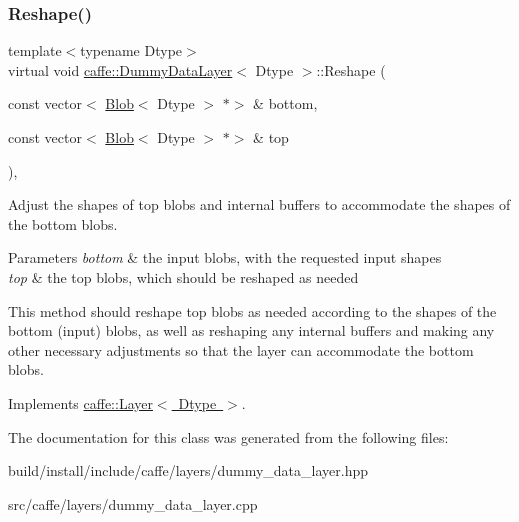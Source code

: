 \subsubsection{\texorpdfstring{Reshape()}{Reshape()}\hspace{0.1cm}{\footnotesize\ttfamily [2/2]}}
{\footnotesize\ttfamily template$<$typename Dtype$>$ \\
virtual void \mbox{\hyperlink{classcaffe_1_1_dummy_data_layer}{caffe\+::\+Dummy\+Data\+Layer}}$<$ Dtype $>$\+::Reshape (\begin{DoxyParamCaption}\item[{const vector$<$ \mbox{\hyperlink{classcaffe_1_1_blob}{Blob}}$<$ Dtype $>$ $\ast$$>$ \&}]{bottom,  }\item[{const vector$<$ \mbox{\hyperlink{classcaffe_1_1_blob}{Blob}}$<$ Dtype $>$ $\ast$$>$ \&}]{top }\end{DoxyParamCaption})\hspace{0.3cm}{\ttfamily [inline]}, {\ttfamily [virtual]}}



Adjust the shapes of top blobs and internal buffers to accommodate the shapes of the bottom blobs. 


\begin{DoxyParams}{Parameters}
{\em bottom} & the input blobs, with the requested input shapes \\
\hline
{\em top} & the top blobs, which should be reshaped as needed\\
\hline
\end{DoxyParams}
This method should reshape top blobs as needed according to the shapes of the bottom (input) blobs, as well as reshaping any internal buffers and making any other necessary adjustments so that the layer can accommodate the bottom blobs. 

Implements \mbox{\hyperlink{classcaffe_1_1_layer_a7fe981e8af8d93d587acf2a952be563d}{caffe\+::\+Layer$<$ Dtype $>$}}.



The documentation for this class was generated from the following files\+:\begin{DoxyCompactItemize}
\item 
build/install/include/caffe/layers/dummy\+\_\+data\+\_\+layer.\+hpp\item 
src/caffe/layers/dummy\+\_\+data\+\_\+layer.\+cpp\end{DoxyCompactItemize}
